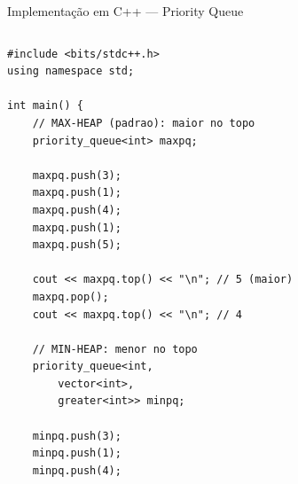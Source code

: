 \documentclass[aspectratio=169,10pt]{beamer}
\begin{document}
\begin{frame}[fragile,shrink=3]{Implementação em C++ --- Priority Queue}
  \begin{columns}[t]
      \begin{tcolorbox}[caixaCodigo]
        \begin{lstlisting}[style=cppstyle]
#include <bits/stdc++.h>
using namespace std;

int main() {
    // MAX-HEAP (padrao): maior no topo
    priority_queue<int> maxpq;

    maxpq.push(3);
    maxpq.push(1);
    maxpq.push(4);
    maxpq.push(1);
    maxpq.push(5);

    cout << maxpq.top() << "\n"; // 5 (maior)
    maxpq.pop();
    cout << maxpq.top() << "\n"; // 4

    // MIN-HEAP: menor no topo
    priority_queue<int,
        vector<int>,
        greater<int>> minpq;

    minpq.push(3);
    minpq.push(1);
    minpq.push(4);


\end{lstlisting}
\end{tcolorbox}
\end{columns}
\end{frame}
\end{document}
